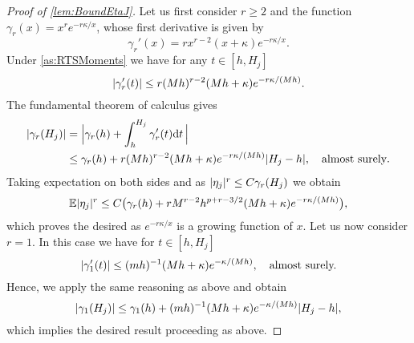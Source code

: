 \documentclass[10pt]{article}
\begin{document}
\begin{proof}[Proof of \cref{lem:BoundEtaJ}] Let us first consider $r \geq 2$ and the function $\gamma_r(x) = x^r e^{-r\kappa/x}$, whose first derivative is given by
	\begin{equation}
	\gamma_r'(x) = rx^{r-2}(x + \kappa) e^{-r\kappa/x}.
	\end{equation}
	Under \cref{as:RTSMoments} we have for any $t \in [h, H_j]$
	\begin{equation}
	\lvert\gamma_r'(t)\rvert \leq r (Mh)^{r-2} (Mh + \kappa)e^{-r\kappa/(Mh)}.
	\end{equation}
	The fundamental theorem of calculus gives
	\begin{equation}
	\begin{aligned}
	\lvert\gamma_r(H_j)\rvert &= \Big\lvert \gamma_r(h) + \int_{h}^{H_j} \gamma_r'(t) \mathrm{d} t \,\Big\rvert\\
	&\leq \gamma_r(h) + r (Mh)^{r-2} (Mh + \kappa)e^{-r\kappa/(Mh)} \lvert H_j - h\rvert, \quad \text{almost surely}.
	\end{aligned}
	\end{equation}
	Taking expectation on both sides and as $\lvert\eta_j\rvert^r \leq C\gamma_r(H_j)$ we obtain
	\begin{equation}
	\operatorname{\mathbb{E}}\lvert\eta_j\rvert^r \leq C\big(\gamma_r(h) + r M^{r-2} h^{p+r-3/2} (Mh + \kappa)e^{-r\kappa/(Mh)}\big),
	\end{equation} 
	which proves the desired as $e^{-r\kappa/x}$ is a growing function of $x$. Let us now consider $r = 1$. In this case we have for $t \in [h, H_j]$
	\begin{equation}
	\lvert\gamma_1'(t)\rvert \leq (mh)^{-1} (Mh + \kappa)e^{-\kappa/(Mh)}, \quad \text{almost surely.}
	\end{equation}
	Hence, we apply the same reasoning as above and obtain
	\begin{equation}
	\lvert\gamma_1(H_j)\rvert \leq \gamma_1(h) + (mh)^{-1} (Mh + \kappa) e^{-\kappa/(Mh)} \lvert H_j - h\rvert,
	\end{equation}
	which implies the desired result proceeding as above.
\end{proof}

%
%
\end{document}
